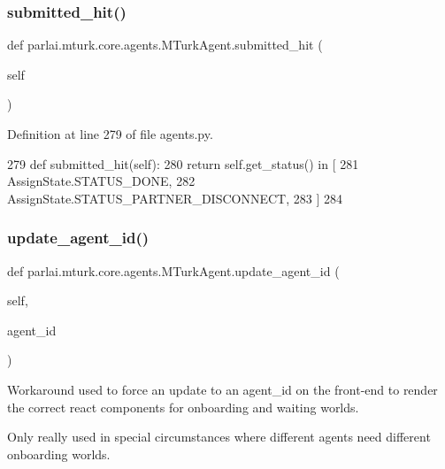 \subsubsection{\texorpdfstring{submitted\+\_\+hit()}{submitted\_hit()}}
{\footnotesize\ttfamily def parlai.\+mturk.\+core.\+agents.\+M\+Turk\+Agent.\+submitted\+\_\+hit (\begin{DoxyParamCaption}\item[{}]{self }\end{DoxyParamCaption})}



Definition at line 279 of file agents.\+py.


\begin{DoxyCode}
279     \textcolor{keyword}{def }submitted\_hit(self):
280         \textcolor{keywordflow}{return} self.get\_status() \textcolor{keywordflow}{in} [
281             AssignState.STATUS\_DONE,
282             AssignState.STATUS\_PARTNER\_DISCONNECT,
283         ]
284 
\end{DoxyCode}
\mbox{\label{classparlai_1_1mturk_1_1core_1_1agents_1_1MTurkAgent_a5d4b1243830669cf21676d878045d5a9}} 
\subsubsection{\texorpdfstring{update\+\_\+agent\+\_\+id()}{update\_agent\_id()}}
{\footnotesize\ttfamily def parlai.\+mturk.\+core.\+agents.\+M\+Turk\+Agent.\+update\+\_\+agent\+\_\+id (\begin{DoxyParamCaption}\item[{}]{self,  }\item[{}]{agent\+\_\+id }\end{DoxyParamCaption})}

\begin{DoxyVerb}Workaround used to force an update to an agent_id on the front-end to render the
correct react components for onboarding and waiting worlds.

Only really used in special circumstances where different agents need different
onboarding worlds.
\end{DoxyVerb}
 

